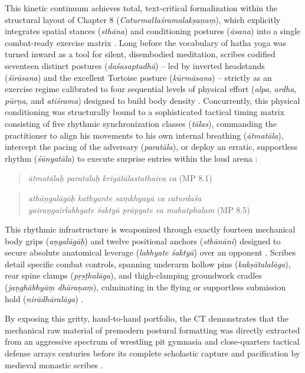 \documentclass[11pt,twoside,letterpaper]{article}
\begin{document}
This kinetic continuum achieves total, text-critical formalization within the structural layout of Chapter 8 (\textit{Caturmallaśramalakṣaṇaṃ}), which explicitly integrates spatial stances (\textit{sthāna}) and conditioning postures (\textit{āsana}) into a single combat-ready exercise matrix \citep{MP_7}. Long before the vocabulary of hatha yoga was turned inward as a tool for silent, disembodied meditation, scribes codified seventeen distinct postures (\textit{daśasaptadhā}) -- led by inverted headstands (\textit{śirāsana}) and the excellent Tortoise posture (\textit{kūrmāsana}) -- strictly as an exercise regime calibrated to four sequential levels of physical effort (\textit{alpa}, \textit{ardha}, \textit{pūrṇa}, and \textit{atiśrama}) designed to build body density \citep{MP_7}. Concurrently, this physical conditioning was structurally bound to a sophisticated tactical timing matrix consisting of five rhythmic synchronization classes (\textit{tālas}), commanding the practitioner to align his movements to his own internal breathing (\textit{ātmatāla}), intercept the pacing of the adversary (\textit{paratāla}), or deploy an erratic, supportless rhythm (\textit{śūnyatāla}) to execute surprise entries within the loud arena \citep{MP_7}:

\begin{quote}
\textit{ātmatālaḥ paratālaḥ kriyātālastathaiva ca} (MP 8.1)  \\
\end{quote}

\begin{quote}
\textit{athāṇgalāgāḥ kathyante saṃkhyayā ca caturdaśa}  \\
\textit{yairaṇgairlabhyate śaktyā prāpyate ca mahatphalam} (MP 8.5)
\end{quote}

This rhythmic infrastructure is weaponized through exactly fourteen mechanical body grips (\textit{aṇgalāgāḥ}) and twelve positional anchors (\textit{sthānāni}) designed to secure absolute anatomical leverage (\textit{labhyate śaktyā}) over an opponent \citep{MP_7}. Scribes detail specific combat controls, spanning underarm hollow pins (\textit{kakṣātalalāga}), rear spine clamps (\textit{pṛṣṭhalāga}), and thigh-clamping groundwork cradles (\textit{jaṇghābhyāṃ dhāraṇaṃ}), culminating in the flying or supportless submission hold (\textit{nirādhāralāga}) \citep{MP_7}. 

By exposing this gritty, hand-to-hand portfolio, the CT demonstrates that the mechanical raw material of premodern postural formatting was directly extracted from an aggressive spectrum of wrestling pit gymnasia and close-quarters tactical defense arrays centuries before its complete scholastic capture and pacification by medieval monastic scribes \citep{MP_7, Wujastyk2025}.
\end{document}
